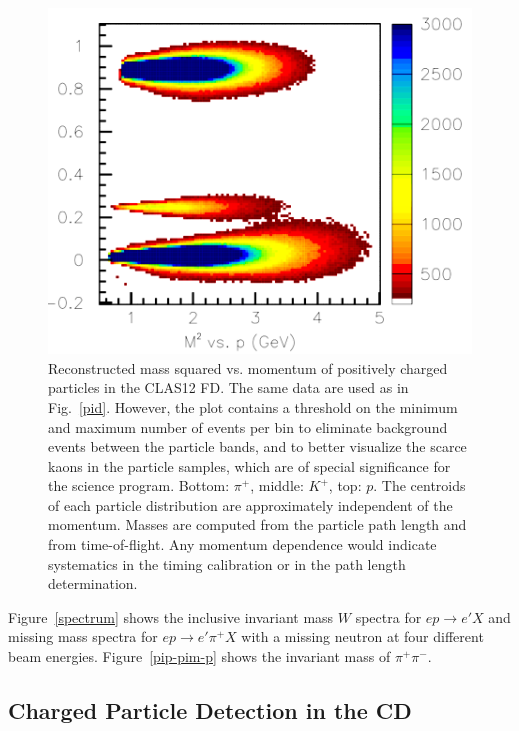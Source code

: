 \documentclass[final,3p]{elsarticle}
\begin{document}
\begin{twocolumn}
\begin{figure}[hp!]
\centerline{\includegraphics[width=1.0\columnwidth]{FTOF1b_M2-vs-p.png}}
\caption{Reconstructed mass squared vs. momentum of positively charged particles in the CLAS12 FD. The same data
  are used as in Fig.~\ref{pid}. However, the plot contains a threshold on the minimum and maximum number of events per
  bin to eliminate background events between the particle bands, and to better visualize the scarce kaons in the particle
  samples, which are of special significance for the science program. Bottom: $\pi^+$, middle: $K^+$, top: $p$. The
  centroids of each particle distribution are approximately independent of the momentum. Masses are computed from
  the particle path length and from time-of-flight. Any momentum dependence would indicate systematics in the timing
  calibration or in the path length determination.}
\label{mass2-mom}
\end{figure} 

Figure~\ref{spectrum} shows the inclusive invariant mass $W$ spectra for $ep \to e' X$ and missing mass spectra
for $ep \to e' \pi^+ X$ with a missing neutron at four different beam energies. Figure~\ref{pip-pim-p} shows the
invariant mass of $\pi^+\pi^-$.

\subsection{Charged Particle Detection in the CD} 


\end{twocolumn}
\end{document}
